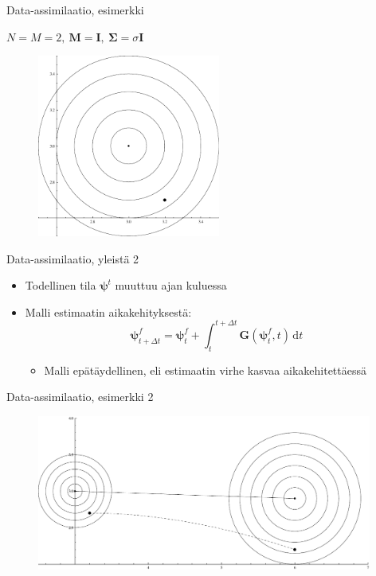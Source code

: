 \documentclass{beamer}
\begin{document}
\begin{frame}{Data-assimilaatio, esimerkki}

$N=M=2,~\mathbf{M} = \mathbf{I},~\boldsymbol{\Sigma} = \sigma\mathbf{I}$

\begin{figure}
\includegraphics[width=6cm]{enkf1.pdf}
\end{figure}

\end{frame}

\begin{frame}{Data-assimilaatio, yleistä 2}

\begin{itemize}
\item Todellinen tila $\boldsymbol{\psi}^t$ muuttuu ajan kuluessa
\item Malli estimaatin aikakehityksestä:
\[
\boldsymbol{\psi}^f_{t+\Delta t} = \boldsymbol{\psi}^f_t + \int_{t}^{t+\Delta t} \! \boldsymbol{G}(\boldsymbol{\psi}^f_t,t) \, \mathrm{d}t
\]
\begin{itemize}
\item Malli epätäydellinen, eli estimaatin virhe kasvaa aikakehitettäessä
\end{itemize}
\end{itemize}

\end{frame}

\begin{frame}{Data-assimilaatio, esimerkki 2}

\begin{figure}
\includegraphics[width=11cm]{enkf2.pdf}
\end{figure}

\end{frame}
\end{document}
